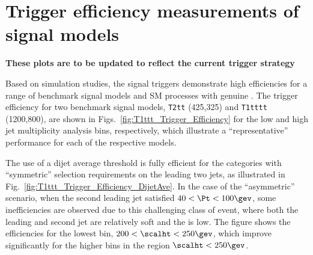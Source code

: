 \clearpage
\section{Trigger efficiency measurements of signal models \label{app:signalModelTriggerEfficiencies}}

{\bf These plots are to be updated to reflect the current trigger strategy}

Based on simulation studies, the signal triggers demonstrate high
efficiencies for a range of benchmark signal models and SM processes
with genuine \met. The trigger efficiency for two benchmark signal
models, \texttt{T2tt} (425,325) and \texttt{T1tttt} (1200,800), are
shown in Figs.~\ref{fig:T1ttt_Trigger_Efficiency} for the low and
high jet multiplicity analysis bins, respectively, which illustrate a
``representative'' performance for each of the respective models.
  
The use of a dijet average threshold is fully efficient for the
categories with ``symmetric'' \Pt selection requirements on the
leading two jets, as illustrated in
Fig.~\ref{fig:T1ttt_Trigger_Efficiency_DijetAve}. In the case of the
``asymmetric'' scenario, when the second leading jet satisfied $40 <
\Pt < 100\gev$, some inefficiencies are observed due to this
challenging class of event, where both the leading and second jet
are relatively soft and the \scalht is low. The figure shows the
efficiencies for the lowest \scalht bin, $200 < \scalht < 250\gev$, 
which improve significantly for the higher \scalht bins in the region
$\scalht < 250\gev$. 


